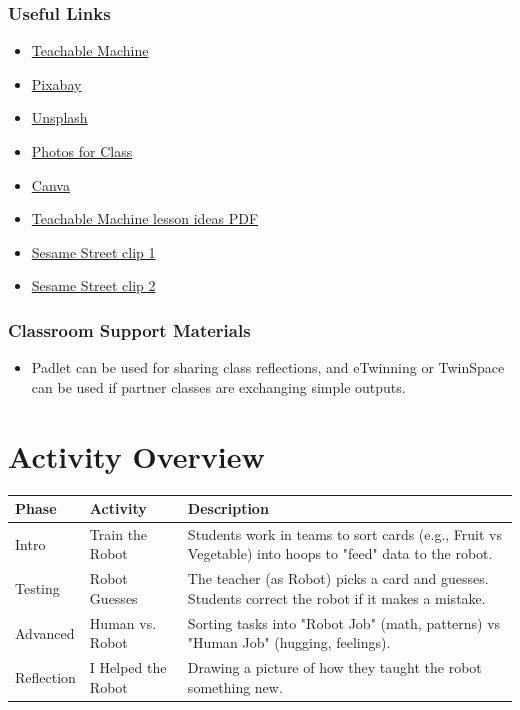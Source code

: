 \documentclass[11pt, a4paper]{article}
\begin{document}
\subsubsection*{Useful Links}
\begin{itemize}
    \item \href{https://teachablemachine.withgoogle.com/}{Teachable Machine}
    \item \href{https://pixabay.com/}{Pixabay}
    \item \href{https://unsplash.com/}{Unsplash}
    \item \href{https://photos-for-class.com/}{Photos for Class}
    \item \href{https://www.canva.com/}{Canva}
    \item \href{https://www.cuny.edu/wp-content/uploads/sites/4/page-assets/research/student-technology-initiatives/TeachableMachine_LessonIdeas.pdf}{Teachable Machine lesson ideas PDF}
    \item \href{https://www.youtube.com/watch?v=2ePf9rue1Ao}{Sesame Street clip 1}
    \item \href{https://www.youtube.com/watch?v=ZtM-3eG_3Qw}{Sesame Street clip 2}
\end{itemize}

\subsubsection*{Classroom Support Materials}
\begin{itemize}
    \item Padlet can be used for sharing class reflections, and eTwinning or TwinSpace can be used if partner classes are exchanging simple outputs.
\end{itemize}

\section*{Activity Overview}
\begingroup
\small
\begin{tabularx}{\textwidth}{|l|l|L|}
    \hline
     \textbf{Phase} & \textbf{Activity} & \textbf{Description} \\ \hline
    Intro & Train the Robot & Students work in teams to sort cards (e.g., Fruit vs Vegetable) into hoops to "feed" data to the robot. \\ \hline
    Testing & Robot Guesses & The teacher (as Robot) picks a card and guesses. Students correct the robot if it makes a mistake. \\ \hline
    Advanced & Human vs. Robot & Sorting tasks into "Robot Job" (math, patterns) vs "Human Job" (hugging, feelings). \\ \hline
    Reflection & I Helped the Robot & Drawing a picture of how they taught the robot something new. \\ \hline
\end{tabularx}
\endgroup
\end{document}
